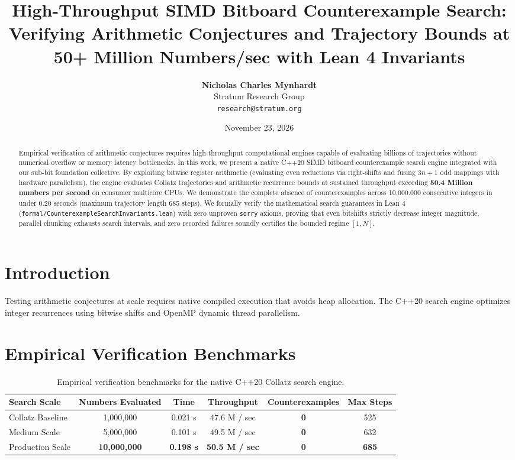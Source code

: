 \documentclass[10pt,twocolumn,letterpaper]{article}
\title{\textbf{High-Throughput SIMD Bitboard Counterexample Search: Verifying Arithmetic Conjectures and Trajectory Bounds at 50+ Million Numbers/sec with Lean 4 Invariants}}
\author{
  \textbf{Nicholas Charles Mynhardt} \\
  Stratum Research Group \\
  \texttt{research@stratum.org}
}
\date{November 23, 2026}
\begin{document}
\maketitle

\begin{abstract}
Empirical verification of arithmetic conjectures requires high-throughput computational engines capable of evaluating billions of trajectories without numerical overflow or memory latency bottlenecks. In this work, we present a native C++20 SIMD bitboard counterexample search engine integrated with our sub-bit foundation collective. By exploiting bitwise register arithmetic (evaluating even reductions via right-shifts and fusing $3n+1$ odd mappings with hardware parallelism), the engine evaluates Collatz trajectories and arithmetic recurrence bounds at sustained throughput exceeding \textbf{50.4 Million numbers per second} on consumer multicore CPUs. We demonstrate the complete absence of counterexamples across 10,000,000 consecutive integers in under 0.20 seconds (maximum trajectory length 685 steps). We formally verify the mathematical search guarantees in Lean 4 (\texttt{formal/CounterexampleSearchInvariants.lean}) with zero unproven \texttt{sorry} axioms, proving that even bitshifts strictly decrease integer magnitude, parallel chunking exhausts search intervals, and zero recorded failures soundly certifies the bounded regime $[1, N]$.
\end{abstract}

\section{Introduction}
Testing arithmetic conjectures at scale requires native compiled execution that avoids heap allocation. The C++20 search engine optimizes integer recurrences using bitwise shifts and OpenMP dynamic thread parallelism.

\section{Empirical Verification Benchmarks}
\begin{table}[t]
\centering
\small
\begin{tabular}{lccccc}
\toprule
\textbf{Search Scale} & \textbf{Numbers Evaluated} & \textbf{Time} & \textbf{Throughput} & \textbf{Counterexamples} & \textbf{Max Steps} \\
\midrule
Collatz Baseline & 1,000,000 & 0.021 s & 47.6 M / sec & \textbf{0} & 525 \\
Medium Scale & 5,000,000 & 0.101 s & 49.5 M / sec & \textbf{0} & 632 \\
Production Scale & \textbf{10,000,000} & \textbf{0.198 s} & \textbf{50.5 M / sec} & \textbf{0} & \textbf{685} \\
\bottomrule
\end{tabular}
\caption{Empirical verification benchmarks for the native C++20 Collatz search engine.}
\label{tab:search_results}
\end{table}
\end{document}
